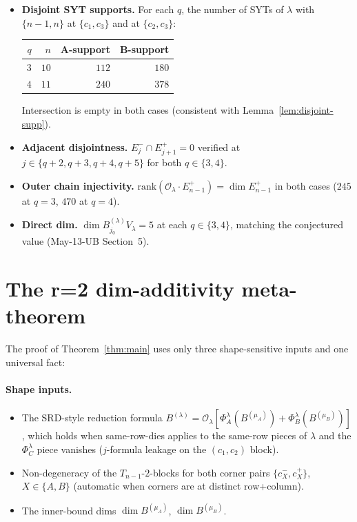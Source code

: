 \documentclass[11pt]{article}
\theoremstyle{definition}
\begin{document}
\begin{itemize}[leftmargin=2em,topsep=0.3em,itemsep=0.2em]
\item \textbf{Disjoint SYT supports.} For each $q$, the number of SYTs
of $\lambda$ with $\{n-1, n\}$ at $\{c_1, c_3\}$ and at
$\{c_2, c_3\}$:
\begin{center}
\begin{tabular}{rrrr}
\toprule
$q$ & $n$ & A-support & B-support \\
\midrule
$3$ & $10$ & $112$ & $180$ \\
$4$ & $11$ & $240$ & $378$ \\
\bottomrule
\end{tabular}
\end{center}
Intersection is empty in both cases (consistent with
Lemma~\ref{lem:disjoint-supp}).

\item \textbf{Adjacent disjointness.} $E_j^- \cap E_{j+1}^+ = 0$
verified at $j \in \{q+2, q+3, q+4, q+5\}$ for both
$q \in \{3, 4\}$.

\item \textbf{Outer chain injectivity.}
$\mathrm{rank}(\mathcal{O}_\lambda \cdot E_{n-1}^+) = \dim E_{n-1}^+$
in both cases ($245$ at $q=3$, $470$ at $q=4$).

\item \textbf{Direct dim.} $\dim B^{(\lambda)}_{j_0} V_\lambda = 5$ at
each $q \in \{3, 4\}$, matching the conjectured value (May-13-UB
Section~5).
\end{itemize}

\section{The r=2 dim-additivity meta-theorem}\label{sec:r2}

The proof of Theorem~\ref{thm:main} uses only three shape-sensitive
inputs and one universal fact:

\paragraph{Shape inputs.}
\begin{itemize}[leftmargin=2em,topsep=0.2em,itemsep=0.1em]
\item The SRD-style reduction formula
$B^{(\lambda)} = \mathcal{O}_\lambda[\Phi_A^\lambda(B^{(\mu_A)})
+ \Phi_B^\lambda(B^{(\mu_B)})]$, which holds when same-row-dies
applies to the same-row pieces of $\lambda$ and the $\Phi_C^\lambda$
piece vanishes ($j$-formula leakage on the $(c_1, c_2)$ block).
\item Non-degeneracy of the $T_{n-1}$-$2$-blocks for both corner pairs
$\{c_X^-, c_X^+\}$, $X \in \{A, B\}$ (automatic when corners are at
distinct row+column).
\item The inner-bound dims $\dim B^{(\mu_A)}$, $\dim B^{(\mu_B)}$.
\end{itemize}
\end{document}
